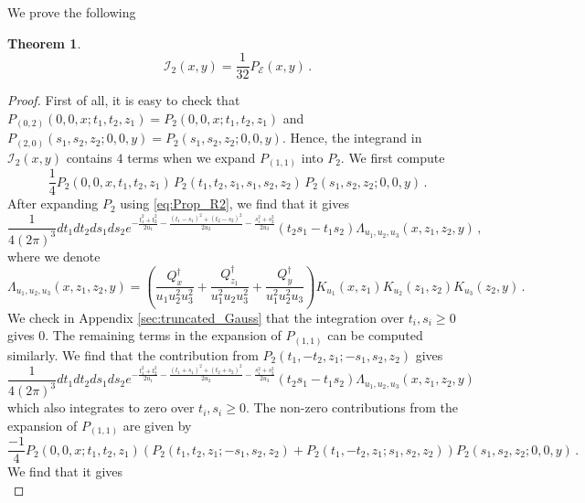 \documentclass[11pt]{article}
\numberwithin{equation}{section}
\newtheorem{theorem}{Theorem}[section]
\begin{document}
We prove the following
\begin{theorem}
	\begin{equation}\label{eq:uni_cor_int}
		\mathcal{I}_2(x,y) = \frac{1}{32}P_{\mathcal{E}}(x,y)\,.
	\end{equation}
\end{theorem}
\begin{proof}
	First of all, it is easy to check that $P_{(0,2)}(0,0,x;t_1,t_2,z_1) = P_2(0,0,x;t_1,t_2,z_1)$ and $P_{(2,0)}(s_1,s_2,z_2;0,0,y) = P_2(s_1,s_2,z_2;0,0,y)$. Hence, the integrand in $\mathcal{I}_2(x,y)$ contains $4$ terms when we expand $P_{(1,1)}$ into $P_2$. We first compute 
\begin{equation}
			\frac{1}{4}P_{2}(0,0,x,t_1,t_2,z_1)\,P_{2}(t_1,t_2,z_1,s_1,s_2,z_2)\,P_{2}(s_1,s_2,z_2;0,0,y)\,.
\end{equation}
	After expanding $P_2$ using \eqref{eq:Prop_R2}, we find that it gives
	\begin{equation}
			\frac{1}{4(2\pi)^3}dt_1dt_2ds_1ds_2e^{ -\frac{t_1^2+ t_2^2}{2u_1} - \frac{(t_1 - s_1)^2 + (t_2 - s_2)^2}{2 u_2} - \frac{s_1^2+ s_2^2}{2 u_3}} (t_2s_1 - t_1s_2)\Lambda_{u_1,u_2,u_3}(x,z_1,z_2,y)\,,
	\end{equation}
	where we denote
	\begin{equation}
		\Lambda_{u_1,u_2,u_3}(x,z_1,z_2,y) = \left(\frac{Q^\dagger_x}{u_1u_2^2u_3^2} + \frac{Q^\dagger_{z_1}}{u_1^2u_2u_3^2} + \frac{Q^\dagger_{y}}{u_1^2u_2^2u_3}\right)K_{u_1}(x,z_1)K_{u_2}(z_1,z_2)K_{u_3}(z_2,y)\,.
	\end{equation}
	We check in Appendix \ref{sec:truncated_Gauss} that the integration over $t_i,s_i \geq 0$ gives $0$. The remaining terms in the expansion of $P_{(1,1)}$ can be computed similarly. We find that the contribution from $P_{2}(t_1,-t_2,z_1;-s_1,s_2,z_2)$ gives
		\begin{equation}
	\frac{1}{4(2\pi)^3}dt_1dt_2ds_1ds_2e^{ -\frac{t_1^2+ t_2^2}{2u_1} - \frac{(t_1 + s_1)^2 + (t_2 + s_2)^2}{2 u_2} - \frac{s_1^2+ s_2^2}{2 u_3}} (t_2s_1 - t_1s_2)\Lambda_{u_1,u_2,u_3}(x,z_1,z_2,y)
	\end{equation}
	which also integrates to zero over $t_i,s_i \geq 0$. The non-zero contributions from the expansion of $P_{(1,1)}$ are given by
	\begin{equation}
		\frac{-1}{4}P_2(0,0,x;t_1,t_2,z_1)\left(P_{2}(t_1,t_2,z_1;-s_1,s_2,z_2) + P_{2}(t_1,-t_2,z_1;s_1,s_2,z_2)\right)P_2(s_1,s_2,z_2;0,0,y)\,.
	\end{equation}
	We find that it gives
		\begin{equation}

\end{equation}
\end{proof}
\end{document}
